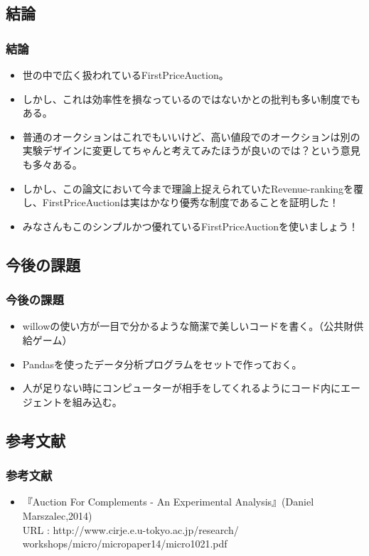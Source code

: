 \documentclass[dvipdfmx,12pt]{beamer}
\begin{document}
\subsection{結論}
\begin{frame}
\frametitle{結論}
\begin{itemize}\setlength{\parskip}{0.5em}
\item
世の中で広く扱われているFirstPriceAuction。\pause
\item
しかし、これは効率性を損なっているのではないかとの批判も多い制度でもある。\pause
\item
普通のオークションはこれでもいいけど、高い値段でのオークションは別の実験デザインに変更してちゃんと考えてみたほうが良いのでは？という意見も多々ある。\pause
\item
しかし、この論文において今まで理論上捉えられていたRevenue-rankingを覆し、FirstPriceAuctionは実はかなり優秀な制度であることを証明した！\pause
\item
みなさんもこのシンプルかつ優れているFirstPriceAuctionを使いましょう！
\end{itemize}
\end{frame}


\subsection{今後の課題}
\begin{frame}
\frametitle{今後の課題}
\begin{itemize}\setlength{\parskip}{0.5em}
\item
willowの使い方が一目で分かるような簡潔で美しいコードを書く。（公共財供給ゲーム）\pause
\item
Pandasを使ったデータ分析プログラムをセットで作っておく。\pause
\item
人が足りない時にコンピューターが相手をしてくれるようにコード内にエージェントを組み込む。
\end{itemize}
\end{frame}

\subsection{参考文献}
\begin{frame}
\frametitle{参考文献}
\begin{itemize}\setlength{\parskip}{0.5em}
\item
『Auction For Complements - An Experimental Analysis』(Daniel Marszalec,2014)\\
URL : http://www.cirje.e.u-tokyo.ac.jp/research/\\
workshops/micro/micropaper14/micro1021.pdf
\end{itemize}
\end{frame}
\end{document}
